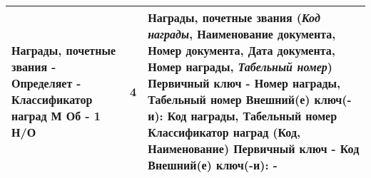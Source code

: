 \documentclass[10pt,a4paper]{article}
\newcommand{\pk}[1]{\textbf{#1}}
\newcommand{\fk}[1]{\textit{#1}}
\newcommand{\pfk}[1]{\pk{\fk{#1}}}
\newcommand{\firstColumn}[4]{#1 - #2 - #3 \newline #4}
\newcommand{\thirdColumn}[6]{#1 \newline Первичный ключ - #2 \newline Внешний(е) ключ(-и): #3 \newline #4 \newline Первичный ключ - #5 \newline Внешний(е) ключ(-и): #6}
\newcommand{\ruleManyMondatoryOneOptionalNum}{4}
\newcommand{\ruleManyMondatoryOneOptional}{М Об - 1 Н/О}
\newcommand{\nagradiPochetnieZvaniya}{Награды, почетные звания (\fk{Код награды}, Наименование документа, Номер документа, Дата документа, \pk{Номер награды}, \pfk{Табельный номер})}
\newcommand{\nagradiPochetnieZvaniyaPK}{Номер награды, Табельный номер}
\newcommand{\nagradiPochetnieZvaniyaFK}{Код награды, Табельный номер}
\newcommand{\kNagrad}{Классификатор наград (\pk{Код}, Наименование)}
\newcommand{\kNagradPK}{Код}
\newcommand{\kNagradFK}{-}
\begin{document}
\begin{center}
\begin{longtable}{ | m{10em} | m{0.5em}| m{30em} | }
 \hline
 \firstColumn{Награды, почетные звания}{Определяет}{Классификатор наград}{\ruleManyMondatoryOneOptional} & \ruleManyMondatoryOneOptionalNum & \thirdColumn{\nagradiPochetnieZvaniya}{\nagradiPochetnieZvaniyaPK}{\nagradiPochetnieZvaniyaFK}{\kNagrad}{\kNagradPK}{\kNagradFK} \\ 
 
 
 \hline
\end{longtable}
\end{center}
\end{document}
